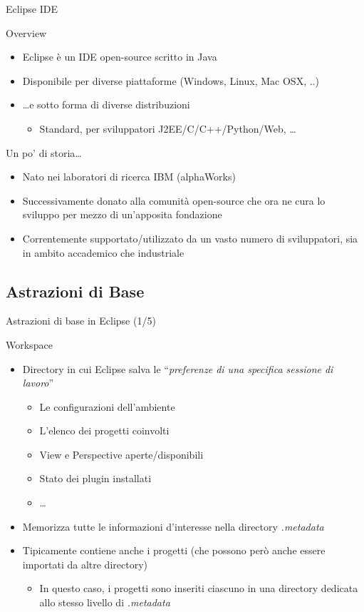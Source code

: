 \documentclass[presentation]{beamer}
\begin{document}
\begin{frame}{Eclipse IDE}
\begin{block}{Overview}
\begin{itemize}
\item Eclipse è un IDE open-source scritto in Java
\item Disponibile per diverse piattaforme (Windows, Linux, Mac OSX, ..)
\item \dots e sotto forma di diverse distribuzioni 
\begin{itemize}
\item Standard, per sviluppatori J2EE/C/C++/Python/Web, \dots
\end{itemize}
\end{itemize}
\end{block}
\vfill
\begin{block}{Un po' di storia\dots}
\begin{itemize}
\item Nato nei laboratori di ricerca IBM (alphaWorks) 
\item	Successivamente	donato alla comunità open-source che ora ne cura lo sviluppo per mezzo di un'apposita fondazione
\item Correntemente supportato/utilizzato da un vasto numero di sviluppatori, sia in ambito accademico che industriale
\end{itemize}
\end{block}
\end{frame}

\subsection{Astrazioni di Base}

\begin{frame}{Astrazioni di base in Eclipse (1/5)}
\begin{block}{Workspace}
\begin{itemize}
\item Directory in cui Eclipse salva le ``\emph{preferenze di una specifica sessione di lavoro}''
\begin{itemize}
\item Le configurazioni dell'ambiente
\item L'elenco dei progetti coinvolti
\item View e Perspective aperte/disponibili
\item Stato dei plugin installati
\item \dots
\end{itemize}
\item Memorizza tutte le informazioni d'interesse nella directory \emph{.metadata}
\item Tipicamente contiene anche i progetti (che possono però anche essere importati da altre directory)
\begin{itemize}
\item In questo caso, i progetti sono inseriti ciascuno in una directory dedicata allo stesso livello di \emph{.metadata}
\end{itemize}
\end{itemize}
\end{block}
\end{frame}
\end{document}

